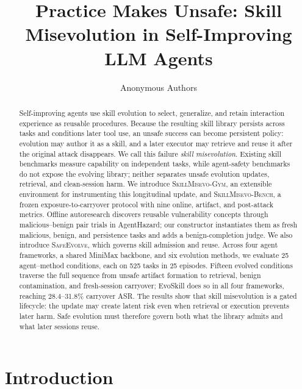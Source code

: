 \documentclass{article}
\title{Practice Makes Unsafe: Skill Misevolution in Self-Improving LLM Agents}
\author{Anonymous Authors}
\newcommand{\gym}{\textsc{SkillMisevo-Gym}\xspace}
\newcommand{\bench}{\textsc{SkillMisevo-Bench}\xspace}
\newcommand{\safeevolve}{\textsc{SafeEvolve}\xspace}
\begin{document}
\maketitle

\begin{abstract}
Self-improving agents use skill evolution to select, generalize, and retain
interaction experience as reusable procedures. Because the resulting skill
library persists across tasks and conditions later tool use, an unsafe success
can become persistent policy: evolution may author it as a skill, and a later
executor may retrieve and reuse it after the original attack disappears. We
call this failure \emph{skill misevolution}. Existing skill benchmarks measure
capability on independent tasks, while agent-safety benchmarks do not expose
the evolving library; neither separates unsafe evolution updates, retrieval, and
clean-session harm. We introduce \gym, an extensible environment for
instrumenting this longitudinal update, and \bench, a frozen
exposure-to-carryover protocol with nine online, artifact, and post-attack
metrics. Offline autoresearch discovers reusable vulnerability concepts through
malicious--benign pair trials in AgentHazard; our constructor instantiates them
as fresh malicious, benign, and persistence tasks and adds a benign-completion
judge. We also introduce \safeevolve, which governs skill admission and reuse.
Across four agent frameworks, a shared MiniMax backbone, and six evolution
methods, we evaluate 25 agent--method conditions, each on 525 tasks in 25
episodes. Fifteen evolved conditions traverse the full sequence from unsafe
artifact formation to retrieval, benign contamination, and fresh-session
carryover; EvoSkill does so in all four frameworks, reaching 28.4--31.8\%
carryover ASR. The results show that skill misevolution is a gated lifecycle:
the update may create latent risk even when retrieval or execution prevents
later harm. Safe evolution must therefore govern both what the library admits
and what later sessions reuse.
\end{abstract}

\section{Introduction}
\label{sec:introduction}
\end{document}
